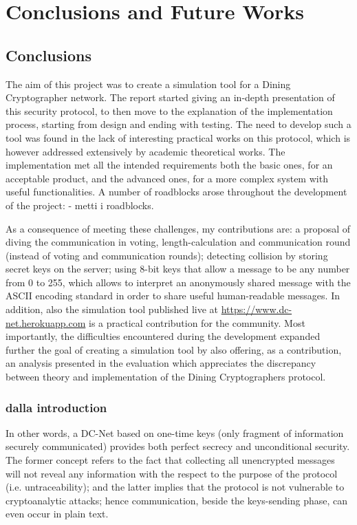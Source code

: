 \chapter{Conclusions and Future Works}

\section{Conclusions}
The aim of this project was to create a simulation tool for a Dining Cryptographer network. The report started giving an in-depth presentation of this security protocol, to then move to the explanation of the implementation process, starting from design and ending with testing. The need to develop such a tool was found in the lack of interesting practical works on this protocol, which is however addressed extensively by academic theoretical works. The implementation met all the intended requirements both the basic ones, for an acceptable product, and the advanced ones, for a more complex system with useful functionalities. A number of roadblocks arose throughout the development of the project: - metti i roadblocks. 

As a consequence of meeting these challenges, my contributions are: a proposal of diving the communication in voting, length-calculation and communication round (instead of voting and communication rounds); detecting collision by storing secret keys on the server; using 8-bit keys that allow a message to be any number from 0 to 255, which allows to interpret an anonymously shared message with the ASCII encoding standard in order to share useful human-readable messages. In addition, also the simulation tool published live at \url{https://www.dc-net.herokuapp.com} is a practical contribution for the community. Most importantly, the difficulties encountered during the development expanded further the goal of creating a simulation tool by also offering, as a contribution, an analysis presented in the evaluation which appreciates the discrepancy between theory and implementation of the Dining Cryptographers protocol.

\subsection{dalla introduction}
In other words, a DC-Net based on one-time keys (only fragment of information securely communicated) provides both perfect secrecy and unconditional security. The former concept refers to the fact that collecting all unencrypted messages will not reveal any information with the respect to the purpose of the protocol (i.e. untraceability); and the latter implies that the protocol is not vulnerable to cryptoanalytic attacks; hence communication, beside the keys-sending phase, can even occur in plain text.



